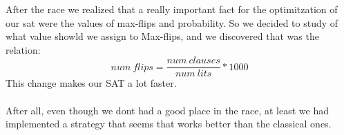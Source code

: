 
After the race we realized that a really important fact for the optimitzation of our sat were the values of max-flips and probability. So we decided to study of what value showld we assign to Max-flips, and we discovered that was the relation: 
$$num\:flips = \frac{num\:clauses}{num\:lits} * 1000$$ 
This change makes our SAT a lot faster.\\
\\
After all, even though we dont had a good place in the race, at least we had implemented a strategy that seems that works better than the classical ones.
